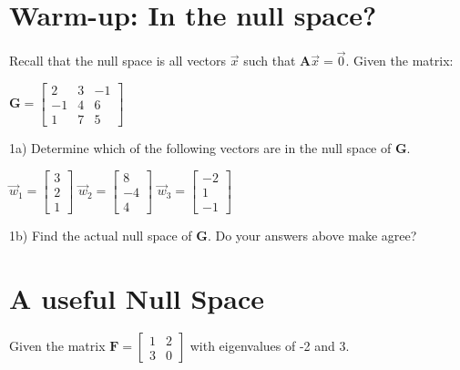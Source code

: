 \documentclass{article}
\begin{document}
\begin{flushleft}
\section*{Warm-up:  In the null space?}
Recall that the null space is all vectors $\vec{x}$ such that $\textbf{A}\vec{x}=\vec{0}$. Given the matrix:\\
\begin{center}
$\textbf{G}=
\begin{bmatrix}
2 & 3 & -1\\
-1 & 4 & 6 \\
1 &  7 & 5
\end{bmatrix}
$\\
\end{center}
1a) Determine which of the following vectors are in the null space of \textbf{G}.\\
\begin{center}
$ \vec{w}_1=\begin{bmatrix} 3 \\ 2 \\ 1 \end{bmatrix} $
\hspace{0.3in}
$ \vec{w}_2=\begin{bmatrix} 8 \\ -4 \\ 4 \end{bmatrix} $
\hspace{0.3in}
$ \vec{w}_3=\begin{bmatrix} -2 \\ 1 \\ -1 \end{bmatrix} $
\end{center}

\vspace{2in}

1b) Find the actual null space of \textbf{G}. Do your answers above make agree?

\newpage

\section*{A useful Null Space}
Given the matrix $\textbf{F} = \begin{bmatrix} 1 & 2 \\ 3 & 0 \end{bmatrix}$ with eigenvalues of -2 and 3.

\vspace{0.1in}


\end{flushleft}
\end{document}
